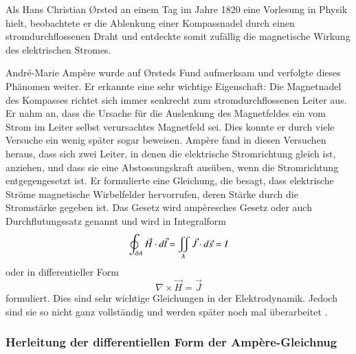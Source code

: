 Als Hans Christian Ørsted an einem Tag im Jahre 1820 eine Vorlesung in Physik hielt, beobachtete er die Ablenkung einer Kompassnadel durch einen stromdurchflossenen Draht und entdeckte somit zufällig die magnetische Wirkung des elektrischen Stromes.

André-Marie Ampère wurde auf Ørsteds Fund aufmerksam und verfolgte dieses Phänomen weiter.
Er erkannte eine sehr wichtige Eigenschaft: Die Magnetnadel des Kompasses richtet sich immer senkrecht zum stromdurchflossenen Leiter aus.
Er nahm an, dass die Ursache für die Auslenkung des Magnetfeldes ein vom Strom im Leiter selbst verursachtes Magnetfeld sei.
Dies konnte er durch viele Versuche ein wenig später sogar beweisen.
Ampère fand in diesen Versuchen heraus, dass sich zwei Leiter, in denen die elektrische Stromrichtung gleich ist, anziehen, und dass sie eine Abstossungskraft ausüben, wenn die Stromrichtung entgegengesetzt ist.
Er formulierte eine Gleichung, die besagt, dass elektrische Ströme magnetische Wirbelfelder hervorrufen, deren Stärke durch die Stromstärke gegeben ist.
Das Gesetz wird ampèresches Gesetz oder auch Durchflutungssatz genannt und wird in Integralform
\begin{equation}
\label{maxwell:equasion:ampere}
\oint_{\d A}
\vec{H}
\cdot
d\vec{l}
=
\iint_{A}
\vec{J}
\cdot
d\vec{s}
=
I
\end{equation}
oder in differentieller Form
\[
\nabla
\times
\vec{H}
=
\vec{J}
\]
formuliert.
Dies sind sehr wichtige Gleichungen in der Elektrodynamik.
Jedoch sind sie so nicht ganz vollständig und werden später noch mal überarbeitet \cite{maxwell:Hans_Christian_Ørsted}\cite{maxwell:André-Marie_Ampère}.

\subsubsection{Herleitung der differentiellen Form der Ampère-Gleichnug}

